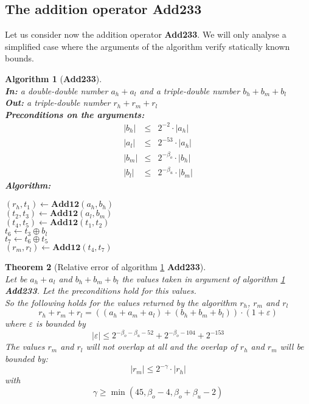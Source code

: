 \documentclass[a4paper,10pt,twoside]{article}
\newtheorem{theorem}{Theorem}[section]
\newtheorem{algorithm}[theorem]{Algorithm}
\newcommand{\hi}{\ensuremath{\mathit{h}}}
\newcommand{\mi}{\ensuremath{\mathit{m}}}
\newcommand{\lo}{\ensuremath{\mathit{l}}}
\newcommand{\AddDTT}{{\bf Add233}}
\newcommand{\mAdd}{\ensuremath{\mathbf{Add12}}}
\renewcommand{\epsilon}{\varepsilon}
\begin{document}
\subsection{The addition operator \AddDTT}
Let us consider now the addition operator \AddDTT. We will only analyse a simplified case where the arguments of the
algorithm verify statically known bounds.
\begin{algorithm}[\AddDTT] \label{addDTTref} ~ \\
{\bf In:} a double-double number $a_\hi + a_\lo$ and a triple-double number $b_\hi + b_\mi + b_\lo$ \\
{\bf Out:} a triple-double number $r_\hi + r_\mi + r_\lo$ \\
{\bf Preconditions on the arguments:}
\begin{eqnarray*}
\left \vert b_\hi \right \vert & \leq & 2^{-2} \cdot \left \vert a_\hi \right \vert \\
\left \vert a_\lo \right \vert & \leq & 2^{-53} \cdot \left \vert a_\hi \right \vert \\
\left \vert b_\mi \right \vert & \leq & 2^{-\beta_o} \cdot \left \vert b_\hi \right \vert \\
\left \vert b_\lo \right \vert & \leq & 2^{-\beta_u} \cdot \left \vert b_\mi \right \vert 
\end{eqnarray*}
{\bf Algorithm:} \\
\begin{center}
\begin{minipage}[b]{50mm}
$\left( r_\hi, t_1 \right) \gets \mAdd\left( a_\hi, b_\hi \right)$ \\
$\left( t_2, t_3 \right) \gets \mAdd\left( a_\lo, b_\mi \right)$ \\
$\left( t_4, t_5 \right) \gets \mAdd\left( t_1, t_2 \right)$ \\
$t_6 \gets t_3 \oplus b_\lo$ \\
$t_7 \gets t_6 \oplus t_5$ \\
$\left( r_\mi, r_\lo \right) \gets \mAdd\left( t_4, t_7 \right)$ \\
\end{minipage}
\end{center}
\end{algorithm}
\begin{theorem}[Relative error of algorithm \ref{addDTTref} \AddDTT] ~ \\
Let be $a_\hi + a_\lo$ and $b_\hi + b_\mi + b_\lo$ the values taken in argument of algorithm \ref{addDTTref} \AddDTT. 
Let the preconditions hold for this values.\\
So the following holds for the values returned by the algorithm $r_\hi$, $r_\mi$ and $r_\lo$ 
$$r_\hi + r_\mi + r_\lo = \left(\left(a_\hi + a_\mi + a_\lo \right) + \left( b_\hi + b_\mi + b_\lo \right)\right) \cdot \left(1 + \epsilon\right)$$
where $\epsilon$ is bounded by
$$\left \vert \epsilon \right \vert \leq 2^{-\beta_o - \beta_u - 52} + 2^{-\beta_o - 104} + 2^{-153}$$
The values $r_\mi$ and $r_\lo$ will not overlap at all and the overlap of $r_\hi$ and $r_\mi$ will be bounded by:
$$\left \vert r_\mi \right \vert \leq 2^{-\gamma} \cdot \left \vert r_\hi \right \vert$$
with
$$\gamma \geq \min\left( 45, \beta_o - 4, \beta_o + \beta_u - 2 \right)$$
\end{theorem}
\end{document}
